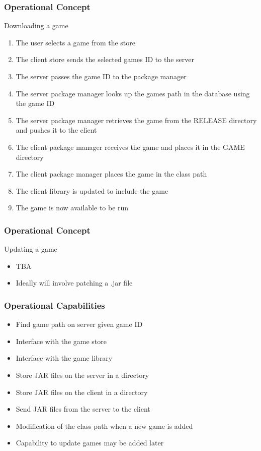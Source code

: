 \documentclass{beamer}
\begin{document}
\begin{frame}
    \frametitle{Operational Concept}
    
    Downloading a game
    
    \begin{enumerate}
        \item   The user selects a game from the store
        \item   The client store sends the selected games ID to the server
        \item   The server passes the game ID to the package manager
        \item   The server package manager looks up the games path in the 
                database using the game ID
        \item   The server package manager retrieves the game from the 
                RELEASE directory and pushes it to the client
        \item   The client package manager receives the game and places it in 
                the GAME directory
        \item   The client package manager places the game in the class path
        \item   The client library is updated to include the game
        \item   The game is now available to be run
    \end{enumerate}
    
\end{frame}

\begin{frame}
    \frametitle{Operational Concept}
    
    Updating a game
    
    \begin{itemize}
        \item   TBA
        \item   Ideally will involve patching a .jar file
    \end{itemize}
    
\end{frame}

\begin{frame}
    \frametitle{Operational Capabilities}

    \begin{itemize}
        \item   Find game path on server given game ID
        \item   Interface with the game store
        \item   Interface with the game library
        \item   Store JAR files on the server in a directory
        \item   Store JAR files on the client in a directory
        \item   Send JAR files from the server to the client
        \item   Modification of the class path when a new game is added
        \item   Capability to update games may be added later
    \end{itemize}
\end{frame}
\end{document}

